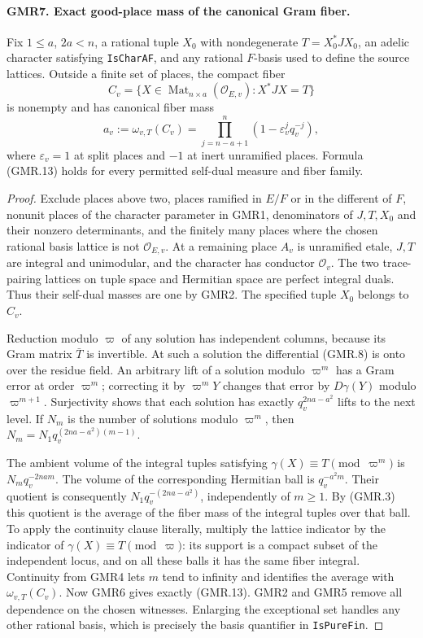 \documentclass[11pt,a4paper]{article}
\numberwithin{equation}{section}
\theoremstyle{remark}\newtheorem{remark}[theorem]{Remark}
\begin{document}
\paragraph{GMR7. Exact good-place mass of the canonical Gram fiber.}
\label{claim:GMR7}
Fix $1\leq a$, $2a<n$, a rational tuple $X_0$ with nondegenerate
$T=X_0^*JX_0$, an adelic character satisfying \texttt{Is\allowbreak Char\allowbreak AF}, and
any rational $F$-basis used to define the source lattices.
Outside a finite set of places, the compact fiber
\[
 C_v=\{X\in\operatorname{Mat}_{n\times a}(\mathcal O_{E,v}):X^*JX=T\}
\]
is nonempty and has canonical fiber mass
\[
 a_v:=\omega_{v,T}(C_v)
       =\prod_{j=n-a+1}^{n}(1-\varepsilon_v^j q_v^{-j}),
 \tag{GMR.13}
\]
where $\varepsilon_v=1$ at split places and $-1$ at inert unramified
places.  Formula (GMR.13) holds for every permitted self-dual measure
and fiber family.

\begin{proof}
Exclude places above two, places ramified in $E/F$ or in the different
of $F$, nonunit places of the character parameter in GMR1, denominators
of $J,T,X_0$ and their nonzero determinants, and the finitely many
places where the chosen rational basis lattice is not
$\mathcal O_{E,v}$.  At a remaining place $A_v$ is unramified etale,
$J,T$ are integral and unimodular, and the character has conductor
$\mathcal O_v$.  The two trace-pairing lattices on tuple space and
Hermitian space are perfect integral duals.  Thus their self-dual
masses are one by GMR2.  The specified tuple $X_0$ belongs to $C_v$.

Reduction modulo $\varpi$ of any solution has independent columns,
because its Gram matrix $\bar T$ is invertible.  At such a solution
the differential (GMR.8) is onto over the residue field.  An arbitrary
lift of a solution modulo $\varpi^m$ has a Gram error at order
$\varpi^m$; correcting it by $\varpi^mY$ changes that error by
$D\gamma(Y)$ modulo $\varpi^{m+1}$.  Surjectivity shows that each
solution has exactly $q_v^{2na-a^2}$ lifts to the next level.
If $N_m$ is the number of solutions modulo $\varpi^m$, then
$N_m=N_1q_v^{(2na-a^2)(m-1)}$.

The ambient volume of the integral tuples satisfying
$\gamma(X)\equiv T\pmod{\varpi^m}$ is $N_mq_v^{-2nam}$.
The volume of the corresponding Hermitian ball is $q_v^{-a^2m}$.
Their quotient is consequently $N_1q_v^{-(2na-a^2)}$, independently
of $m\geq1$.  By (GMR.3) this quotient is the average of the fiber
mass of the integral tuples over that ball.  To apply the continuity
clause literally, multiply the lattice indicator by the indicator
of $\gamma(X)\equiv T\pmod\varpi$: its support is a compact subset
of the independent locus, and on all these balls it has the same
fiber integral.  Continuity from GMR4 lets $m$ tend to infinity and
identifies the average with $\omega_{v,T}(C_v)$.
Now GMR6 gives exactly (GMR.13).  GMR2 and GMR5 remove all dependence
on the chosen witnesses.  Enlarging the exceptional set handles any
other rational basis, which is precisely the basis quantifier in
\texttt{Is\allowbreak Pure\allowbreak Fin}.
\end{proof}
\end{document}
